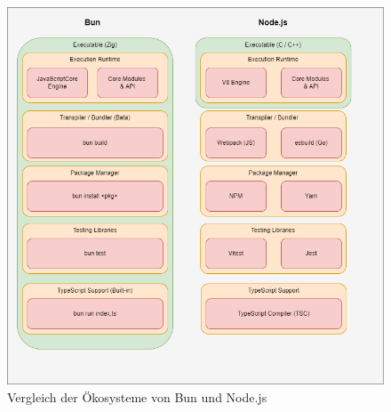 \begin{figure}[H]
	\centering
	\includegraphics[width=\linewidth]{./images/EcosystemBunvsNode.png}
	\caption{Vergleich der Ökosysteme von Bun und Node.js}
	\label{fig:ecosystemComparison}
\end{figure}

